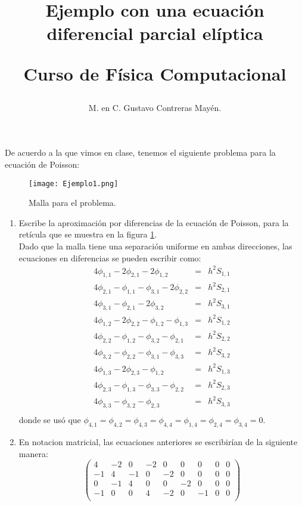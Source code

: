 \documentclass[12pt]{article}
\author{M. en C. Gustavo Contreras Mayén.}
\title{Ejemplo con una ecuación diferencial parcial elíptica \\ \begin{Large}Curso de Fí­sica Computacional\end{Large}}
\date{ }
\numberwithin{equation}{section}
\begin{document}
\maketitle
De acuerdo a la que vimos en clase, tenemos el siguiente problema para la ecuación de Poisson:
\begin{figure} [!h]
	\centering
	\texttt{[image: Ejemplo1.png]} 
	\caption{Malla para el problema.}
	\label{fig:malla1}
\end{figure}
\begin{enumerate}
\item Escribe la aproximación por diferencias de la ecuación de Poisson, para la retícula que se muestra en la figura \ref{fig:malla1}.
\\
Dado que la malla tiene una separación uniforme en ambas direcciones, las ecuaciones en diferencias se pueden escribir como:
\begin{eqnarray*}
	4 \phi_{1,1} - 2 \phi_{2,1} - 2 \phi_{1,2} & = & h^{2}S_{1,1} \\
	4 \phi_{2,1} - \phi_{1,1} - \phi_{3,1} - 2 \phi_{2,2} & = & h^{2}S_{2,1} \\			4 \phi_{3,1} - \phi_{2,1} - 2 \phi_{3,2} & = & h^{2}S_{3,1} \\
	4 \phi_{1,2} - 2 \phi_{2,2} - \phi_{1,2} - \phi_{1,3} & = & h^{2}S_{1,2} \\
	4 \phi_{2,2} - \phi_{1,2} - \phi_{3,2} - \phi_{2,1}  & = & h^{2}S_{2,2} \\
	4 \phi_{3,2} - \phi_{2,2} - \phi_{3,1} - \phi_{3,3}  & = & h^{2}S_{3,2} \\
	4 \phi_{1,3} - 2 \phi_{2,3} - \phi_{1,2} & = & h^{2}S_{1,3} \\
	4 \phi_{2,3} - \phi_{1,3} - \phi_{3,3} - \phi_{2,2}  & = & h^{2}S_{2,3} \\
	4 \phi_{3,3} - \phi_{3,2} - \phi_{2,3} & = & h^{2}S_{3,3} \\
\end{eqnarray*}
donde se usó que $\phi_{4,1}=\phi_{4,2}=\phi_{4,3}=\phi_{4,4}=\phi_{1,4}=\phi_{2,4}=\phi_{3,4}=0$.
\item En notacion matricial, las ecuaciones anteriores se escribirían de la siguiente manera:
\begin{equation*}
	\begin{pmatrix}
		4 & -2 & 0 & -2 & 0 & 0 & 0 & 0 & 0 \\
		-1 & 4 & -1 & 0 & -2 & 0 & 0 & 0 & 0 \\
		0 & -1 & 4 & 0 & 0 & -2 & 0 & 0 & 0 \\
		-1 & 0 & 0 & 4 & -2 & 0 & -1 & 0 & 0 \\

\end{pmatrix}
\end{equation*}
\end{enumerate}
\end{document}
